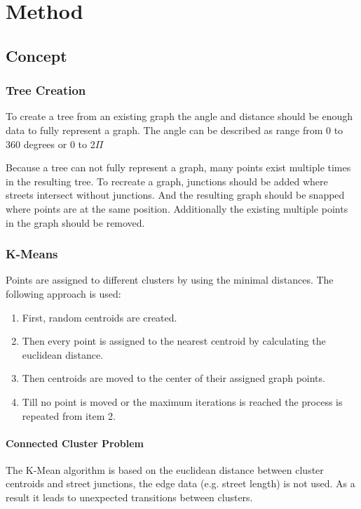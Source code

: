 \chapter{Method}
\section{Concept}
\subsection{Tree Creation}
To create a tree from an existing graph the angle and distance should be enough data to fully represent a graph. The angle can be described as range from 0 to 360 degrees or 0 to 2$\Pi$

Because a tree can not fully represent a graph, many points exist multiple times in the resulting tree. To recreate a graph, junctions should be added where streets intersect without junctions. And the resulting graph should be snapped where points are at the same position. Additionally the existing multiple points in the graph should be removed.

\pagebreak
\subsection{K-Means}
Points are assigned to different clusters by using the minimal distances. The following approach is used:

\begin{enumerate}
    \item First, random centroids are created.
    \item Then every point is assigned to the nearest centroid by calculating the euclidean distance.
    \item Then centroids are moved to the center of their assigned graph points.
    \item Till no point is moved or the maximum iterations is reached the process is repeated from item 2.
\end{enumerate}

\subsubsection{Connected Cluster Problem} \label{sec:kmenasProblem}
The K-Mean algorithm is based on the euclidean distance between cluster centroids and street junctions, the edge data (e.g. street length) is not used. As a result it leads to unexpected transitions between clusters.

